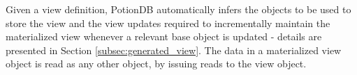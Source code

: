 \documentclass[sigplan,twocolumn,review,anonymous]{acmart}
\begin{document}
Given a view definition, PotionDB automatically infers the objects to be used to store the view and
the view updates required to incrementally maintain the materialized view whenever a relevant base object 
is updated - details are presented in Section \ref{subsec:generated_view}.
The data in a materialized view object is read as any other object, by issuing reads
to the view object.


\end{document}
